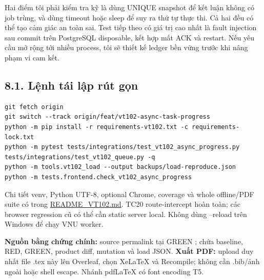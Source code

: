 \documentclass[10pt,a4paper]{article}
\newcommand{\code}[1]{{\small\expandafter\path\expandafter{#1}}}
\newcommand{\Green}{7a06e62}
\newcommand{\repo}{https://github.com/5-Bit-System/SE_Project}
\begin{document}
Hai điểm tôi phải kiểm tra kỹ là dùng UNIQUE snapshot để kết luận không có job trùng, và dùng timeout hoặc sleep để suy ra thứ tự thực thi. Cả hai đều có thể tạo cảm giác an toàn sai. Test tiếp theo có giá trị cao nhất là fault injection sau commit trên PostgreSQL disposable, kết hợp mất ACK và restart. Nếu yêu cầu mở rộng tới nhiều process, tôi sẽ thiết kế ledger bền vững trước khi nâng phạm vi cam kết.

\subsection*{8.1. Lệnh tái lập rút gọn}
\begin{lstlisting}
git fetch origin
git switch --track origin/feat/vt102-async-task-progress
python -m pip install -r requirements-vt102.txt -c requirements-lock.txt
python -m pytest tests/integrations/test_vt102_async_progress.py tests/integrations/test_vt102_queue.py -q
python -m tools.vt102_load --output backups/load-reproduce.json
python -m tests.frontend.check_vt102_async_progress
\end{lstlisting}
Chi tiết venv, Python UTF-8, optional Chrome, coverage và whole offline/PDF suite có trong
\href{\repo/blob/feat/vt102-async-task-progress/README_VT102.md}{README\_VT102.md}.
TC20 route-intercept hoàn toàn; các browser regression cũ có thể cần static server local.
Không dùng --reload trên Windows để chạy VNU worker.

\textbf{Nguồn bằng chứng chính:} source permalink tại GREEN \code{\Green};
\code{docs/vt102/evidence/} chứa baseline, RED, GREEN, product diff, mutation và load JSON.
\textbf{Xuất PDF:} upload duy nhất file .tex này lên Overleaf, chọn XeLaTeX và Recompile;
không cần .bib/ảnh ngoài hoặc shell escape. Nhánh pdfLaTeX có font encoding T5.
\end{document}
